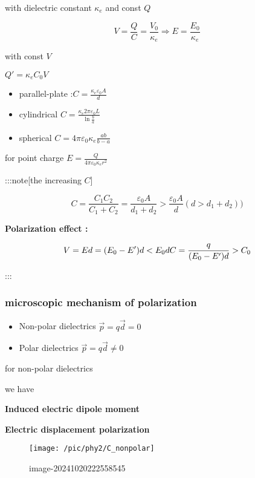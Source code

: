 \documentclass[
]{article}
\providecommand{\tightlist}{%
  \setlength{\itemsep}{0pt}\setlength{\parskip}{0pt}}
\begin{document}
with dielectric constant \(\kappa _e\) and const \(Q\)

\[
V=\frac{Q}{C}=\frac{V_0}{\kappa_e}\Rightarrow E= \frac{E_0}{\kappa_e}
\]

with const \(V\)

\(Q'=\kappa _e C_0V\)

\begin{itemize}
\tightlist
\item
  parallel-plate :\(C=\frac{\kappa_e \varepsilon _0 A}{d}\)
\item
  cylindrical
  \(C=\frac{\kappa_e 2\pi \varepsilon _0 L}{\ln \frac {b}{a}}\)
\item
  spherical \(C=4\pi \varepsilon _0\kappa_e\frac{ab}{b-a}\)
\end{itemize}

for point charge
\(\displaystyle E=\frac{Q}{4\pi \varepsilon _0\kappa_e r^2}\)

:::note{[}the increasing \(C\){]}

\[
C=\frac{C_1C_2}{C_1+C_2}=\frac{\varepsilon _0 A }{d_1+d_2}>\frac{\varepsilon _0 A}{d}(d>d_1+d_2))
\]

\textbf{Polarization effect :}

\[
V=Ed=(E_0-E')d<E_0d\\C=\frac{q}{(E_0-E')d}>C_0
\]

:::

\hypertarget{microscopic-mechanism-of-polarization}{%
\subsubsection{microscopic mechanism of
polarization}\label{microscopic-mechanism-of-polarization}}

\begin{itemize}
\tightlist
\item
  Non-polar dielectrics \(\vec p=q\vec d=0\)
\item
  Polar dielectrics \(\vec p=q\vec d\neq 0\)
\end{itemize}

for non-polar dielectrics

we have

\textbf{Induced electric dipole moment}

\textbf{Electric displacement polarization}

\begin{figure}
\centering
\texttt{[image: /pic/phy2/C\_nonpolar]}
\caption{image-20241020222558545}
\end{figure}
\end{document}
